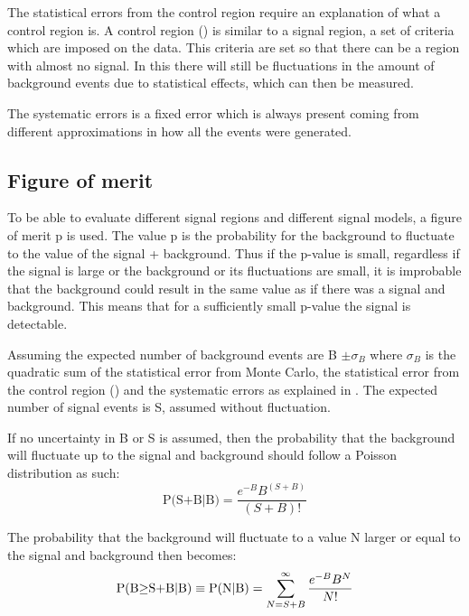 The statistical errors from the control region require an explanation of what a control region is. A control region (\abbrCR) is similar to a signal region, a set of criteria which are imposed on the data. This criteria are set so that there can be a region with almost no signal. In this \abbrCR there will still be fluctuations in the amount of background events due to statistical effects, which can then be measured. 

The systematic errors is a fixed error which is always present coming from different approximations in how all the events were generated. 

\subsection{Figure of merit}\label{subsec:figmer}
To be able to evaluate different signal regions and different signal models, a figure of merit p is used. The value p is the probability for the background to fluctuate to the value of the signal + background. Thus if the p-value is small, regardless if the signal is large or the background or its fluctuations are small, it is improbable that the background could result in the same value as if there was a signal and background. This means that for a sufficiently small p-value the signal is detectable.  

Assuming the expected number of background events are B $\pm \sigma_B$ where $\sigma_B$ is the quadratic sum of the statistical error from Monte Carlo, the statistical error from the control region (\abbrCR) and the systematic errors as explained in . The expected number of signal events is S, assumed without fluctuation. 

If no uncertainty in B or S is assumed, then the probability that the background will fluctuate up to the signal and background should follow a Poisson distribution as such:
\begin{equation}
\text{P(S+B|B)}=\frac{e^{-B}B^{(S+B)}}{(S+B)!}
\end{equation} 

The probability that the background will fluctuate to a value N larger or equal to the signal and background then becomes:
\begin{equation}
\text{P(B$ \geq$S+B|B)} \equiv \text{P(N|B)}=\sum_{N=S+B}^{\infty}  \frac{e^{-B}B^N}{N!}
\end{equation} 

